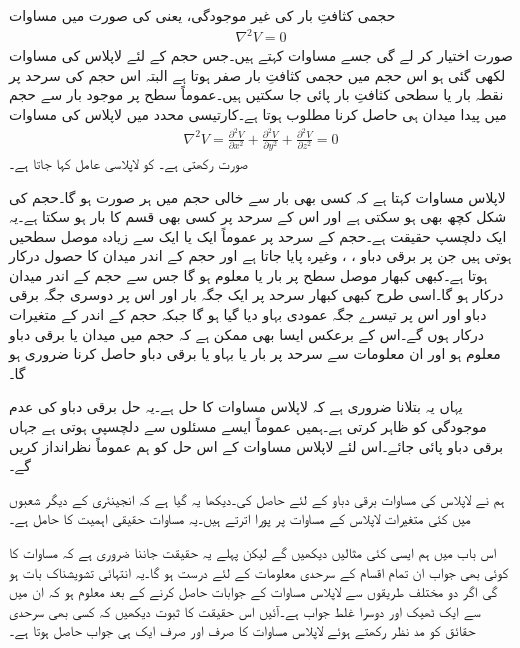 حجمی کثافتِ بار کی غیر موجودگی، یعنی  کی صورت میں مساوات 
\begin{align}\label{مساوات_لاپلاس_لاپلاس_نقطہ_شکل}
\nabla^2 V=0
\end{align}
صورت اختیار کر لے گی جسے  مساوات کہتے ہیں۔جس حجم کے لئے لاپلاس کی مساوات لکھی گئی ہو اس حجم میں حجمی کثافتِ بار صفر ہوتا ہے البتہ اس حجم کی سرحد پر نقطہ بار یا سطحی کثافتِ بار پائی جا سکتیں ہیں۔عموماً سطح پر موجود بار سے حجم میں پیدا میدان ہی حاصل کرنا مطلوب ہوتا ہے۔کارتیسی محدد میں لاپلاس کی مساوات
\begin{align}\label{مساوات_لاپلاس_لاپلاس_کارتیسی_شکل}
\nabla^2 V=\frac{\partial^2 V}{\partial x^2}+\frac{\partial^2 V}{\partial y^2}+\frac{\partial^2 V}{\partial z^2}=0
\end{align}
صورت رکھتی ہے۔ کو لاپلاسی عامل کہا جاتا ہے۔

لاپلاس مساوات کہتا ہے کہ کسی بھی بار سے خالی حجم میں ہر صورت  ہو گا۔حجم کی شکل کچھ بھی ہو سکتی ہے اور اس کے سرحد پر کسی بھی قسم کا بار ہو سکتا ہے۔یہ ایک دلچسپ حقیقت ہے۔حجم کے سرحد پر عموماً ایک یا ایک سے زیادہ موصل سطحیں ہوتی ہیں جن پر برقی دباو ، ،  وغیرہ پایا جاتا ہے اور حجم کے اندر میدان کا حصول درکار ہوتا ہے۔کبھی کبھار موصل سطح پر بار یا  معلوم ہو گا جس سے حجم کے اندر میدان درکار ہو گا۔اسی طرح کبھی کبھار سرحد پر ایک جگہ بار اور اس پر دوسری جگہ برقی دباو اور اس پر تیسرے  جگہ عمودی بہاو دیا گیا ہو گا جبکہ حجم کے اندر کے متغیرات درکار ہوں گے۔اس کے برعکس ایسا بھی ممکن ہے کہ حجم میں میدان یا برقی دباو معلوم ہو اور ان معلومات سے سرحد پر بار یا بہاو یا برقی دباو حاصل کرنا ضروری ہو گا۔

یہاں یہ بتلانا ضروری ہے کہ  لاپلاس مساوات کا حل ہے۔یہ حل برقی دباو کی عدم موجودگی کو ظاہر کرتی ہے۔ہمیں عموماً ایسے مسئلوں سے دلچسپی ہوتی ہے جہاں برقی دباو پائی جائے۔اس لئے  لاپلاس مساوات کے اس حل کو ہم عموماً نظرانداز کریں گے۔ 

ہم نے لاپلاس کی مساوات برقی دباو کے لئے حاصل کی۔دیکھا یہ گیا ہے کہ انجینئری کے دیگر شعبوں میں کئی متغیرات لاپلاس کے مساوات پر پورا اترتے ہیں۔یہ مساوات حقیقی اہمیت کا حامل ہے۔ 

اس باب میں ہم ایسی کئی مثالیں دیکھیں گے لیکن پہلے یہ حقیقت جاننا ضروری ہے کہ مساوات  کا کوئی بھی جواب ان تمام اقسام کے سرحدی معلومات کے لئے درست ہو گا۔یہ انتہائی تشویشناک بات ہو گی اگر دو مختلف طریقوں سے لاپلاس مساوات کے جوابات حاصل کرنے کے بعد معلوم ہو کہ ان میں سے ایک ٹھیک اور دوسرا غلط جواب ہے۔آئیں اس حقیقت کا ثبوت دیکھیں کہ کسی بھی سرحدی حقائق کو مد نظر رکھتے ہوئے لاپلاس مساوات کا صرف اور صرف ایک ہی جواب حاصل ہوتا ہے۔

